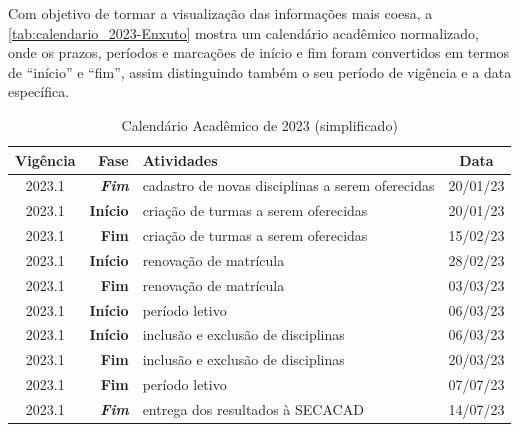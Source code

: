 Com objetivo de tormar a visualização das informações mais coesa, a \autoref{tab:calendario_2023-Enxuto} mostra um calendário acadêmico normalizado, onde os prazos, períodos e marcações de início e fim foram convertidos em termos de ``início'' e ``fim'', assim distinguindo também o seu período de vigência e a data específica.

\begin{table}[H] \centering \caption{Calendário Acadêmico de 2023 (simplificado)} \label{tab:calendario_2023-Enxuto}
  \begin{tabular}{| c r l c |}
    \hline
    \textbf{Vigência} & \textbf{Fase}         & \textbf{Atividades}                              & \textbf{Data} \\
    \hline

    2023.1            & \textbf{\textit{Fim}} & cadastro de novas disciplinas a serem oferecidas & 20/01/23      \\
    2023.1            & \textbf{Início}       & criação de turmas a serem oferecidas             & 20/01/23      \\
    2023.1            & \textbf{Fim}          & criação de turmas a serem oferecidas             & 15/02/23      \\
    2023.1            & \textbf{Início}       & renovação de matrícula                           & 28/02/23      \\
    2023.1            & \textbf{Fim}          & renovação de matrícula                           & 03/03/23      \\
    2023.1            & \textbf{Início}       & período letivo                                   & 06/03/23      \\
    2023.1            & \textbf{Início}       & inclusão e exclusão de disciplinas               & 06/03/23      \\
    2023.1            & \textbf{Fim}          & inclusão e exclusão de disciplinas               & 20/03/23      \\
    2023.1            & \textbf{Fim}          & período letivo                                   & 07/07/23      \\
    2023.1            & \textbf{\textit{Fim}} & entrega dos resultados à SECACAD                 & 14/07/23      \\


\end{tabular}
\end{table}
